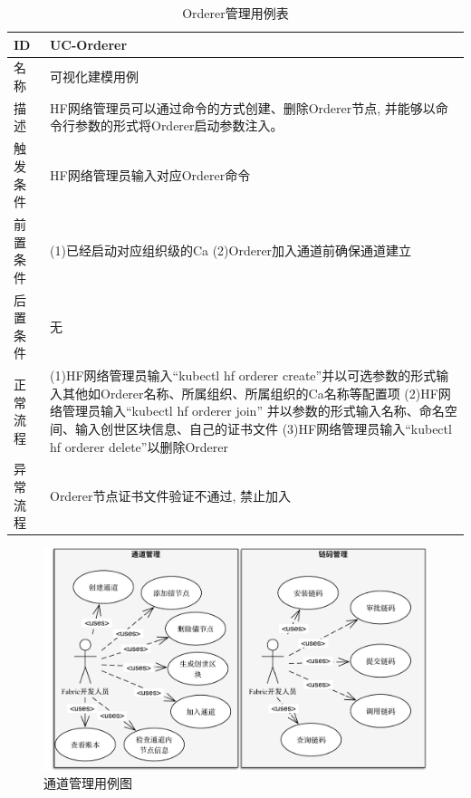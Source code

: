 {\footnotesize
\begin{longtable}[h]{m{60pt}|m{280pt}}
    \caption[Orderer管理用例表]{Orderer管理用例表} \label{orderer_use_case} \\
        \hline  
        ID&UC-Orderer\\
        \hline
        名称&可视化建模用例\\
        \hline
        描述&HF网络管理员可以通过命令的方式创建、删除Orderer节点, 并能够以命令行参数的形式将Orderer启动参数注入。\\
        \hline
        触发条件&HF网络管理员输入对应Orderer命令\\
        \hline
        前置条件& (1)已经启动对应组织级的Ca
        \newline (2)Orderer加入通道前确保通道建立\\
        \hline
        后置条件&无\\
        \hline
        正常流程& (1)HF网络管理员输入“kubectl hf orderer create”并以可选参数的形式输入其他如Orderer名称、所属组织、所属组织的Ca名称等配置项
        \newline (2)HF网络管理员输入“kubectl hf orderer join” 并以参数的形式输入名称、命名空间、输入创世区块信息、自己的证书文件
        \newline (3)HF网络管理员输入“kubectl hf orderer delete”以删除Orderer \\
        \hline 
        异常流程& Orderer节点证书文件验证不通过, 禁止加入\\
        \hline
    \end{longtable} 
}

\begin{figure}[!htbp] %
    \centering %
    \includegraphics[width=1.0\textwidth]{FIGs/chapter5/chan_cc_use_case.pdf} %
    \caption{通道管理用例图} %
    \label{chan_cc_use_case_pic} %
\end{figure}%

